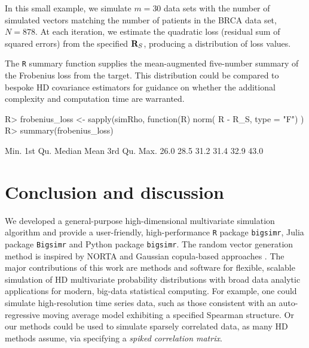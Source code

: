 \documentclass[
]{jss}
\begin{document}
In this small example, we simulate \(m=30\) data sets with the number of
simulated vectors matching the number of patients in the BRCA data set,
\(N=878\). At each iteration, we estimate the quadratic loss (residual
sum of squared errors) from the specified \({\bf R}_{S}\), producing a
distribution of loss values.

\begin{CodeChunk}
\end{CodeChunk}

The \texttt{R} summary function supplies the mean-augmented five-number
summary of the Frobenius loss from the target. This distribution could
be compared to bespoke HD covariance estimators for guidance on whether
the additional complexity and computation time are warranted.

\begin{CodeChunk}
\begin{CodeInput}
R> frobenius_loss <- sapply(simRho, function(R) norm( R - R_S, type = "F")  )
R> summary(frobenius_loss)
\end{CodeInput}
\begin{CodeOutput}
   Min. 1st Qu.  Median    Mean 3rd Qu.    Max. 
   26.0    28.5    31.2    31.4    32.9    43.0 
\end{CodeOutput}
\end{CodeChunk}

\hypertarget{discussion}{%
\section{Conclusion and discussion}\label{discussion}}

We developed a general-purpose high-dimensional multivariate simulation
algorithm and provide a user-friendly, high-performance \texttt{R}
package \texttt{bigsimr}, Julia package \texttt{Bigsimr} and Python
package \texttt{bigsimr}. The random vector generation method is
inspired by NORTA \citep{Cario1997} and Gaussian copula-based approaches
\citep[\citet{BF17}, \citet{Xia17}]{MB13}. The major contributions of
this work are methods and software for flexible, scalable simulation of
HD multivariate probability distributions with broad data analytic
applications for modern, big-data statistical computing. For example,
one could simulate high-resolution time series data, such as those
consistent with an auto-regressive moving average model exhibiting a
specified Spearman structure. Or our methods could be used to simulate
sparsely correlated data, as many HD methods assume, via specifying a
\emph{spiked correlation matrix}.
\end{document}
